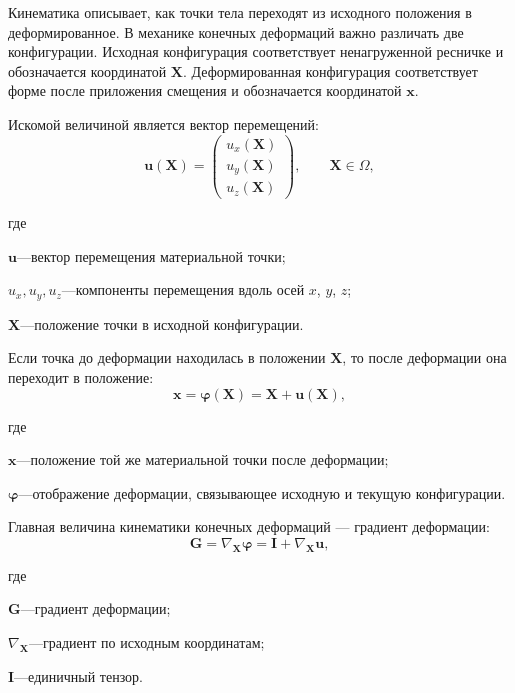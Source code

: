 \documentclass[14pt,a4paper]{extarticle}
\newif\ifwherefirst
\newcommand{\whereitem}[2]{%
    \ifwherefirst
        \wherefirstfalse
        #1\hspace{0.25em}---\hspace{0.25em}#2\par
    \else
        \noindent\hspace*{\parindent}\hphantom{где\enspace}#1\hspace{0.25em}---\hspace{0.25em}#2\par
    \fi
}
\newenvironment{whereblock}{%
    \vspace*{-1.55\baselineskip}%
    \begingroup
    \singlespacing
    \wherefirsttrue
    \par\indent где\enspace\ignorespaces
}{%
    \par\endgroup
    \par\vspace{\baselineskip}
}
\begin{document}
Кинематика описывает, как точки тела переходят из исходного положения в деформированное. В механике конечных деформаций важно различать две конфигурации. Исходная конфигурация соответствует ненагруженной ресничке и обозначается координатой \(\mathbf{X}\). Деформированная конфигурация соответствует форме после приложения смещения и обозначается координатой \(\mathbf{x}\).

Искомой величиной является вектор перемещений:
\begin{equation}
    \mathbf{u}(\mathbf{X})
    =
    \begin{pmatrix}
        u_x(\mathbf{X})\\
        u_y(\mathbf{X})\\
        u_z(\mathbf{X})
    \end{pmatrix},
    \qquad
    \mathbf{X}\in\Omega,
\end{equation}
\begin{whereblock}
\whereitem{\(\mathbf{u}\)}{вектор перемещения материальной точки;}
\whereitem{\(u_x,u_y,u_z\)}{компоненты перемещения вдоль осей \(x\), \(y\), \(z\);}
\whereitem{\(\mathbf{X}\)}{положение точки в исходной конфигурации.}
\end{whereblock}

Если точка до деформации находилась в положении \(\mathbf{X}\), то после деформации она переходит в положение:
\begin{equation}
    \mathbf{x}
    =
    \boldsymbol{\varphi}(\mathbf{X})
    =
    \mathbf{X}+\mathbf{u}(\mathbf{X}),
\end{equation}
\begin{whereblock}
\whereitem{\(\mathbf{x}\)}{положение той же материальной точки после деформации;}
\whereitem{\(\boldsymbol{\varphi}\)}{отображение деформации, связывающее исходную и текущую конфигурации.}
\end{whereblock}

Главная величина кинематики конечных деформаций --- градиент деформации:
\begin{equation}
    \mathbf{G}
    =
    \nabla_{\mathbf{X}}\boldsymbol{\varphi}
    =
    \mathbf{I}
    +
    \nabla_{\mathbf{X}}\mathbf{u},
\end{equation}
\begin{whereblock}
\whereitem{\(\mathbf{G}\)}{градиент деформации;}
\whereitem{\(\nabla_{\mathbf{X}}\)}{градиент по исходным координатам;}
\whereitem{\(\mathbf{I}\)}{единичный тензор.}
\end{whereblock}
\end{document}
